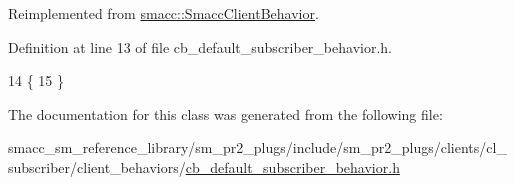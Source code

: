 Reimplemented from \hyperlink{classsmacc_1_1SmaccClientBehavior_a7962382f93987c720ad432fef55b123f}{smacc\+::\+Smacc\+Client\+Behavior}.



Definition at line 13 of file cb\+\_\+default\+\_\+subscriber\+\_\+behavior.\+h.


\begin{DoxyCode}
14     \{
15     \}
\end{DoxyCode}


The documentation for this class was generated from the following file\+:\begin{DoxyCompactItemize}
\item 
smacc\+\_\+sm\+\_\+reference\+\_\+library/sm\+\_\+pr2\+\_\+plugs/include/sm\+\_\+pr2\+\_\+plugs/clients/cl\+\_\+subscriber/client\+\_\+behaviors/\hyperlink{sm__pr2__plugs_2include_2sm__pr2__plugs_2clients_2cl__subscriber_2client__behaviors_2cb__default__subscriber__behavior_8h}{cb\+\_\+default\+\_\+subscriber\+\_\+behavior.\+h}\end{DoxyCompactItemize}
